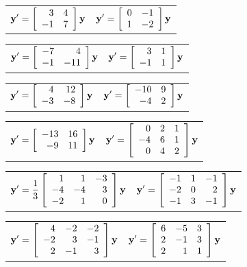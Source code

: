 \begin{exerciselist}
  \begin{tabular}[t]{@{}p{168pt}@{}p{168pt}}
    \item\label{exer:10.5.1} $\displaystyle{{\bf y}'=\left[\begin{array}{rr} 3&4\\-1&7\end{array}\right]{\bf y}}$ &
    \item\label{exer:10.5.2} $\displaystyle{{\bf y}'=\left[\begin{array}{rr} 0&-1\\1&-2\end{array}\right]{\bf y}}$
  \end{tabular}

  \begin{tabular}[t]{@{}p{168pt}@{}p{168pt}}
    \item\label{exer:10.5.3} $\displaystyle{{\bf y}'=\left[\begin{array}{rr} -7&4\\-1&-11\end{array}\right]{\bf y}}$ &
    \item\label{exer:10.5.4} $\displaystyle{{\bf y}'=\left[\begin{array}{rr} 3&1\\-1&1\end{array}\right]{\bf y}}$
  \end{tabular}

  \begin{tabular}[t]{@{}p{168pt}@{}p{168pt}}
    \item\label{exer:10.5.5} $\displaystyle{{\bf y}'=\left[\begin{array}{rr} 4&12\\-3&-8\end{array}\right]{\bf y}}$ &
    \item\label{exer:10.5.6} $\displaystyle{{\bf y'}=\left[\begin{array}{rr} -10&9\\-4&2\end{array}\right]{\bf y}}$
  \end{tabular}

  \begin{tabular}[t]{@{}p{168pt}@{}p{168pt}}
    \item\label{exer:10.5.7} $\displaystyle{{\bf y'}=\left[\begin{array}{rr} -13&16\\-9&11\end{array}\right]{\bf y}}$ &
    \item\label{exer:10.5.8} $\displaystyle{{\bf y'}=\left[\begin{array}{rrr} 0&2&1\\-4&6&1\\0&4&2\end{array}\right]{\bf y}}$
  \end{tabular}

  \begin{tabular}[t]{@{}p{168pt}@{}p{168pt}}
    \item\label{exer:10.5.9} $\displaystyle{{\bf y}'=\frac{1}{3}\left[\begin{array}{rrr} 1&1&-3\\-4&-4&3\\-2&1&0\end{array}\right]{\bf y}}$ &
    \item\label{exer:10.5.10} $\displaystyle{{\bf y}' =\left[\begin{array}{rrr} -1&1&-1\\-2&0&2\\-1&3&-1\end{array}\right]{\bf y}}$
  \end{tabular}

  \begin{tabular}[t]{@{}p{168pt}@{}p{168pt}}
    \item\label{exer:10.5.11} $\displaystyle{{\bf y}' =\left[\begin{array}{rrr} 4&-2&-2\\-2&3&-1\\2&-1&3\end{array}\right]{\bf y}}$ &
    \item\label{exer:10.5.12} $\displaystyle{{\bf y}'= \left[\begin{array}{rrr} 6&-5&3\\2&-1&3\\2&1&1\end{array}\right]{\bf y}}$
  \end{tabular}


\end{exerciselist}
